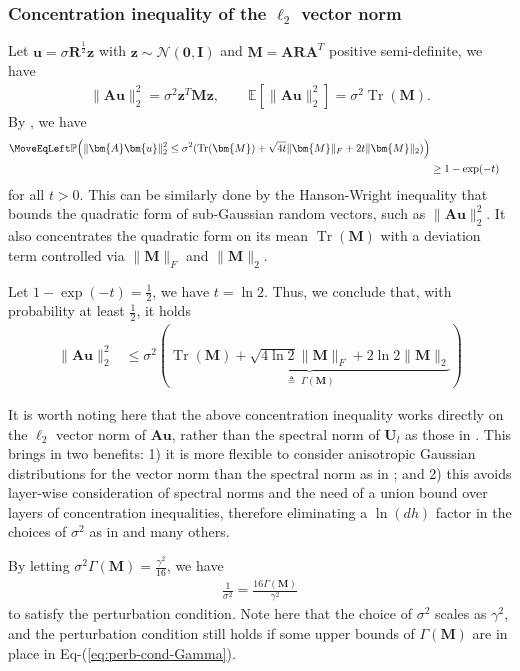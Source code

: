 \documentclass[journal]{IEEEtran} %
\def\eqref#1{Eq-(\ref{#1})}
\newcommand{\nn}{\nonumber}
\def\vzero{{\bm{0}}}
\def\vu{{\bm{u}}}
\def\vz{{\bm{z}}}
\def\mA{{\bm{A}}}
\def\mI{{\bm{I}}}
\def\mM{{\bm{M}}}
\def\mR{{\bm{R}}}
\def\mU{{\bm{U}}}
\def\gN{{\mathcal{N}}}
\newcommand{\E}{\mathbb{E}}
\newcommand{\Norm}[1]{\|#1\|}
\DeclareMathOperator{\Tr}{Tr}
\begin{document}
\subsubsection{Concentration inequality of the $\ell_2$ vector norm}
Let $\vu=\sigma \mR^{\frac{1}{2}}\vz$ with $\vz \sim \gN(\vzero,\mI)$ and $\mM=\mA \mR \mA^T$ positive semi-definite, we have
\begin{align}
    \Norm{\mA \vu}_2^2 = \sigma^2 \vz^T \mM \vz, \qquad \E [\Norm{\mA \vu}_2^2] = \sigma^2 \Tr(\mM).
\end{align}
By \cite[Proposition 1.1]{hsu2012tail}, we have
\begin{align}
  \MoveEqLeft  \mathbb{P}\Big(\Norm{\mA \vu}_2^2 \le \sigma^2(\Tr(\mM) + \sqrt{4t} \Norm{\mM}_F + 2t \Norm{\mM}_2)\Big) \nn \\
  &\ge 1 - \exp(-t)
\end{align}
for all $t>0$. 
This can be similarly done by the Hanson-Wright inequality \cite{rudelson2013hanson} that bounds the quadratic form of sub-Gaussian random vectors, such as $\Norm{\mA \vu}_2^2$. It also concentrates the quadratic form on its mean $\Tr(\mM)$ with a deviation term controlled via $\Norm{\mM}_F$ and $\Norm{\mM}_2$.

Let $1 - \exp(-t) = \frac{1}{2}$, we have $t=\ln 2$. 
Thus, we conclude that, with probability at least $\frac{1}{2}$, it holds
\begin{align}
     \Norm{\mA \vu}_2^2 &\le \sigma^2 (\underbrace{\Tr(\mM) + \sqrt{4\ln2} \Norm{\mM}_F + 2\ln 2 \Norm{\mM}_2}_{\triangleq \; \Gamma(\mM)})
\end{align}

It is worth noting here that the above concentration inequality works directly on the $\ell_2$ vector norm of $\mA \vu$, rather than the spectral norm of $\mU_l$ as those in \cite{neyshabur2018pac,xiao2023pac,jin2022enhancing,11027475,liao2020pac}. This brings in two benefits: 1) it is more flexible to consider anisotropic Gaussian distributions for the vector norm than the spectral norm as in \cite{11027475}; and 2) this avoids layer-wise consideration of spectral norms and the need of a union bound over layers of concentration inequalities, therefore eliminating a $\ln (dh)$ factor in the choices of $\sigma^2$ as in \cite{neyshabur2018pac,xiao2023pac,jin2022enhancing,11027475,liao2020pac} and many others.

By letting $\sigma^2 \Gamma(\mM) = \frac{\gamma^2}{16}$, we have
\begin{align} \label{eq:perb-cond-Gamma}
    \frac{1}{\sigma^{2}} = \frac{16 \Gamma(\mM)}{\gamma^2}
\end{align}
to satisfy the perturbation condition. Note here that the choice of $\sigma^2$ scales as $\gamma^2$, and the perturbation condition still holds if some upper bounds of $\Gamma(\mM)$ are in place in \eqref{eq:perb-cond-Gamma}.
\end{document}
